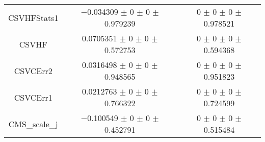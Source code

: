 \begin{table}
\begin{tabular}{ccc}
CSVHFStats1 & \num{-0.034309} $\pm$ \num{0} $\pm$ \num{0} $\pm$ \num{0.979239} & \num{0} $\pm$ \num{0} $\pm$ \num{0} $\pm$ \num{0.978521}\\
CSVHF & \num{0.0705351} $\pm$ \num{0} $\pm$ \num{0} $\pm$ \num{0.572753} & \num{0} $\pm$ \num{0} $\pm$ \num{0} $\pm$ \num{0.594368}\\
CSVCErr2 & \num{0.0316498} $\pm$ \num{0} $\pm$ \num{0} $\pm$ \num{0.948565} & \num{0} $\pm$ \num{0} $\pm$ \num{0} $\pm$ \num{0.951823}\\
CSVCErr1 & \num{0.0212763} $\pm$ \num{0} $\pm$ \num{0} $\pm$ \num{0.766322} & \num{0} $\pm$ \num{0} $\pm$ \num{0} $\pm$ \num{0.724599}\\
CMS\_scale\_j & \num{-0.100549} $\pm$ \num{0} $\pm$ \num{0} $\pm$ \num{0.452791} & \num{0} $\pm$ \num{0} $\pm$ \num{0} $\pm$ \num{0.515484}\\
\bottomrule
\end{tabular}
\end{table}